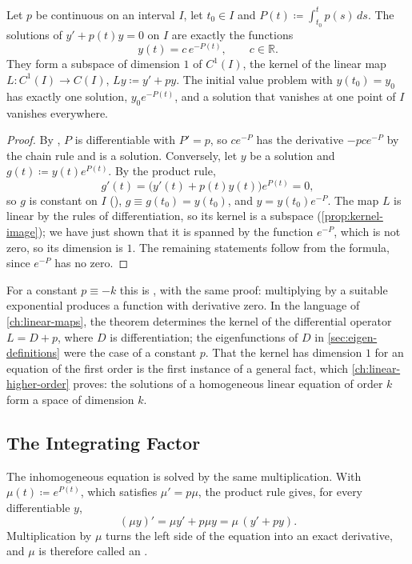 \begin{theorem}
\label{thm:linear-homogeneous}
Let $p$ be continuous on an interval $I$, let $t_0\in I$ and $P(t)\coloneqq\int_{t_0}^tp(s)\,ds$. The solutions of $y'+p(t)y=0$ on $I$ are exactly the functions
\[
y(t)=c\,e^{-P(t)},\qquad c\in\mathbb R .
\]
They form a subspace of dimension $1$ of $C^1(I)$, the kernel of the linear map $L\colon C^1(I)\to C(I)$, $Ly\coloneqq y'+py$. The initial value problem with $y(t_0)=y_0$ has exactly one solution, $y_0e^{-P(t)}$, and a solution that vanishes at one point of $I$ vanishes everywhere.
\end{theorem}

\begin{proof}
By , $P$ is differentiable with $P'=p$, so $ce^{-P}$ has the derivative $-pce^{-P}$ by the chain rule and is a solution. Conversely, let $y$ be a solution and $g(t)\coloneqq y(t)e^{P(t)}$. By the product rule,
\[
g'(t)=\bigl(y'(t)+p(t)y(t)\bigr)e^{P(t)}=0 ,
\]
so $g$ is constant on $I$ (), $g\equiv g(t_0)=y(t_0)$, and $y=y(t_0)e^{-P}$. The map $L$ is linear by the rules of differentiation, so its kernel is a subspace (\cref{prop:kernel-image}); we have just shown that it is spanned by the function $e^{-P}$, which is not zero, so its dimension is $1$. The remaining statements follow from the formula, since $e^{-P}$ has no zero.
\end{proof}

For a constant $p\equiv-k$ this is , with the same proof: multiplying by a suitable exponential produces a function with derivative zero. In the language of \cref{ch:linear-maps}, the theorem determines the kernel of the differential operator $L=D+p$, where $D$ is differentiation; the eigenfunctions of $D$ in \cref{sec:eigen-definitions} were the case of a constant $p$. That the kernel has dimension $1$ for an equation of the first order is the first instance of a general fact, which \cref{ch:linear-higher-order} proves: the solutions of a homogeneous linear equation of order $k$ form a space of dimension $k$.

\subsection{The Integrating Factor}

The inhomogeneous equation is solved by the same multiplication. With $\mu(t)\coloneqq e^{P(t)}$, which satisfies $\mu'=p\mu$, the product rule gives, for every differentiable $y$,
\begin{equation}
(\mu y)'=\mu y'+p\mu y=\mu\,(y'+py).
\label{eq:integrating-factor}
\end{equation}
Multiplication by $\mu$ turns the left side of the equation into an exact derivative, and $\mu$ is therefore called an .


